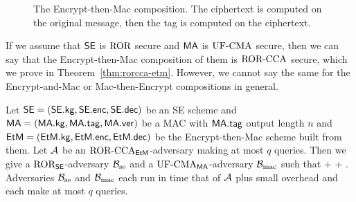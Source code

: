 \begin{figure}[h]
	\centering
	\caption{The Encrypt-then-Mac composition. The ciphertext is computed on the original message, then the tag is computed on the ciphertext.}
\end{figure}

If we assume that ${\mathsf{SE}}$ is $\textnormal{ROR}$ secure and $\mathsf{MA}$ is $\textnormal{UF-CMA}$ secure, then we can say that the Encrypt-then-Mac composition of them is $\textnormal{ROR-CCA}$ secure, which we prove in Theorem~\ref{thm:rorcca-etm}. However, we cannot say the same for the Encrypt-and-Mac or Mac-then-Encrypt compositions in general. 

\begin{theorem}
Let ${\mathsf{SE}}=({\mathsf{SE}}.{\sf kg},{\mathsf{SE}}.{\sf enc},{\mathsf{SE}}.{\sf dec})$ be an SE scheme and $\mathsf{MA}=(\mathsf{MA}.{\sf kg},\mathsf{MA}.\mathsf{tag},\mathsf{MA}.\mathsf{ver})$ be a MAC with $\mathsf{MA}.\mathsf{tag}$ output length $n$ and $\mathsf{EtM}=(\mathsf{EtM}.{\sf kg},\mathsf{EtM}.{\sf enc},\mathsf{EtM}.{\sf dec})$ be the Encrypt-then-Mac
scheme built from them.  Let ${\mathcal A}$ be an $\textnormal{ROR-CCA}_{\mathsf{EtM}}$-adversary making at most
$q$ queries. Then we give a $\textnormal{ROR}_{\mathsf{SE}}$-adversary ${\mathcal B}_{\textrm{se}}$ 
and a $\textnormal{UF-CMA}_{\mathsf{MA}}$-adversary  ${\mathcal B}_\textrm{mac}$ 
such that
\bnm
  \AdvRORCCA{\EtM}{\advA} \le {} +  +  \;.
\enm
Adversaries ${\mathcal B}_\textrm{se}$ and ${\mathcal B}_{\textrm{mac}}$ each run in time that of 
${\mathcal A}$ plus small overhead and each make at most $q$ queries.
\label{thm:rorcca-etm}
\end{theorem}

